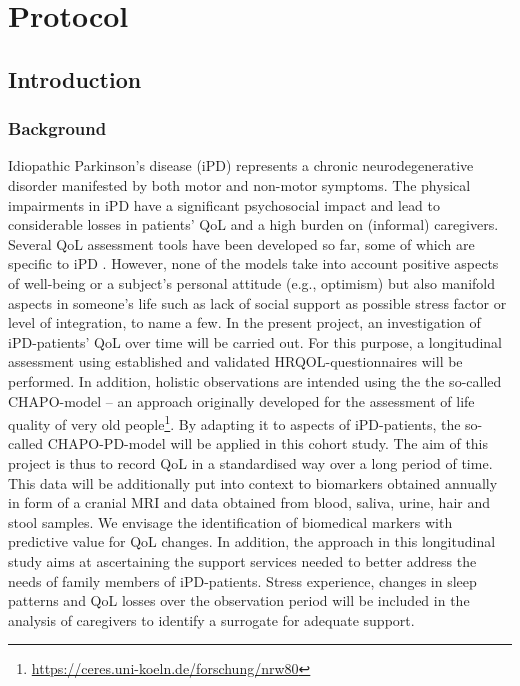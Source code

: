 \chapter{Protocol}
\section{Introduction}
\subsection{Background}
Idiopathic Parkinson's disease (\acs{iPD}) represents a chronic neurodegenerative disorder manifested by both motor and non-motor symptoms. The physical impairments in \ac{iPD} have a significant psychosocial impact and lead to considerable losses in patients'  \ac{QoL} and a high burden on (informal) caregivers. Several \ac{QoL} assessment tools have been developed so far, some of which are specific to \ac{iPD} \citep{stuhrenberg2022jpm}. However, none of the models take into account positive aspects of well-being or a subject's personal attitude (e.g., optimism) but also manifold aspects in someone's life such as lack of social support as possible stress factor or level of integration, to name a few. In the present project, an investigation of \ac{iPD}-patients' \ac{QoL} over time will be carried out. For this purpose, a longitudinal assessment using established and validated \ac{HRQOL}-questionnaires will be performed. In addition, holistic observations are intended using the the so-called \textsc{CHAPO}-model -- an approach originally developed for the assessment of life quality of very old people\footnote{\url{https://ceres.uni-koeln.de/forschung/nrw80}}. By adapting it to aspects of \ac{iPD}-patients, the so-called \acs{CHAPO-PD}-model \citep{thieken2022jpd} will be applied in this cohort study. The aim of this project is thus to record \ac{QoL} in a standardised way over a long period of time. This data will be additionally put into context to biomarkers obtained annually in form of a cranial \ac{MRI} and data obtained from blood, saliva, urine, hair and stool samples. We envisage the identification of biomedical markers with predictive value for \ac{QoL} changes. In addition, the approach in this longitudinal study aims at ascertaining the support services needed to better address the needs of family members of \ac{iPD}-patients. Stress experience, changes in sleep patterns and \ac{QoL} losses over the observation period will be included in the analysis of caregivers to identify a surrogate for adequate support.


